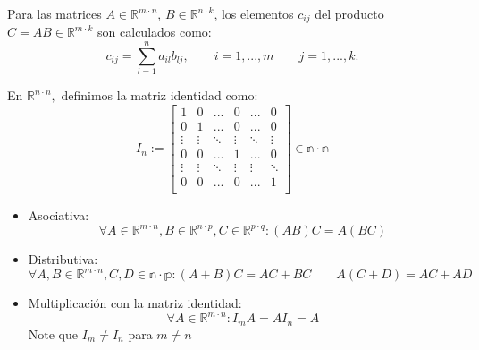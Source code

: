 \begin{tcolorbox}[colframe=white]
    \begin{def.} Para las matrices $A\in \mathbb{R}^{m\cdot n}$, $B\in \mathbb{R}^{n\cdot k}$, los elementos $c_{ij}$ del producto $C=AB \in \mathbb{R}^{m\cdot k}$ son calculados como:
	$$c_{ij} = \sum\limits_{l=1}^{n} a_{il} b_{lj}, \qquad i=1,...,m \qquad j=1,...,k.$$
    \end{def.}
\end{tcolorbox}

\begin{tcolorbox}[colframe=white]
    \begin{def.} En $\mathbb{R}^{n\cdot n},$ definimos la matriz identidad como:
	$$I_n:= \begin{bmatrix}	
	    1&0&...&0&...&0\\
	    0&1&...&0&...&0\\
	    \vdots&\vdots&\ddots&\vdots&\ddots&\vdots\\
	    0&0&...&1&...&0\\
	    \vdots&\vdots&\ddots&\vdots&\vdots&\ddots\\
	    0&0&...&0&...&1\\
	\end{bmatrix} \in \mathbb{n\cdot n}$$
    \end{def.}
\end{tcolorbox}

\begin{tcolorbox}[colframe=white]
    \begin{itemize}
	\item Asociativa: $$\forall A \in \mathbb{R}^{m\cdot n}, B \in \mathbb{R}^{n\cdot p}, C \in \mathbb{R}^{p\cdot q}: (AB)C=A(BC)$$
	\item Distributiva: $$\forall A,B \in \mathbb{R}^{m\cdot n}, C,D \in \mathbb{n\cdot p}: (A+B)C = AC + BC \qquad A(C+D)=AC + AD$$
	\item Multiplicación con la matriz identidad: $$\forall A \in \mathbb{R}^{m\cdot n}: I_m A = AI_n = A$$ Note que $I_m \neq I_n$ para $m\neq n$
    \end{itemize}
\end{tcolorbox}
